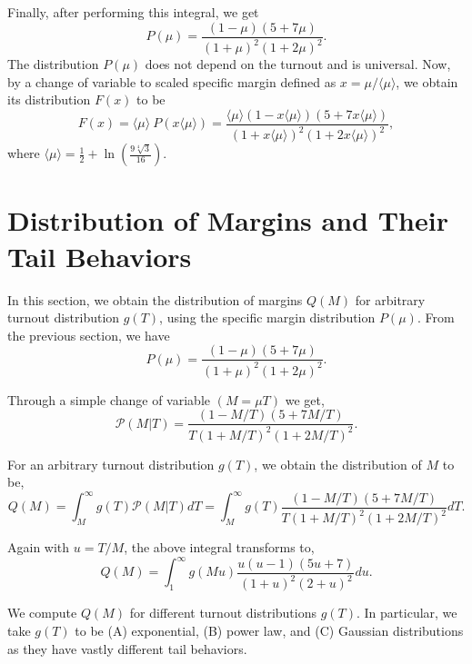 \documentclass[reprint,aps,prl,showpacs,twocolumn, superscriptaddress]{revtex4-2}
\begin{document}
Finally, after performing this integral, we get 
\begin{equation}
    P(\mu) = \frac{(1 - \mu)(5 + 7\mu)}{(1 + \mu)^2(1 + 2\mu)^2}.
\end{equation}
The distribution $P(\mu)$ does not depend on the turnout and is universal. Now, by a change of variable to scaled specific margin defined as $x = \mu / \langle \mu \rangle$, we obtain its distribution $F(x)$ to be
\begin{equation}
    F\left(x\right) = \langle \mu \rangle ~ P\left( x \langle \mu \rangle \right) =  \frac{\langle \mu \rangle(1 - x \langle \mu \rangle)(5 + 7x \langle \mu \rangle)}{(1 + x \langle \mu \rangle)^2(1 + 2x \langle \mu \rangle)^2}, 
\end{equation}
where $\langle \mu\rangle = \frac{1}{2}+\ln \left(\frac{9 \sqrt[4]{3}}{16}\right)$.

\section{Distribution of Margins and Their Tail Behaviors}
In this section, we obtain the distribution of margins $Q(M)$ for arbitrary turnout distribution $g(T)$, using the specific margin distribution $P(\mu)$. From the previous section, we have
\begin{equation}
    P(\mu) = \frac{(1 - \mu)(5 + 7\mu)}{(1 + \mu)^2(1 + 2\mu)^2}.
\end{equation}

Through a simple change of variable $(M = \mu T)$ we get,
\begin{equation}
    \mathcal{P}(M|T) = \frac{(1 - M / T)(5 + 7M /T)}{T(1 + M / T)^2(1 + 2M / T)^2}.
\end{equation}

For an arbitrary turnout distribution $g(T)$, we obtain the distribution of $M$ to be,
\begin{equation}
    Q(M) = \int_{M}^{\infty}g(T)\mathcal{P}(M |T) dT = \int_{M}^{\infty}g(T)\frac{(1 - M / T)(5 + 7M /T)}{T(1 + M / T)^2(1 + 2M / T)^2} dT.
\end{equation}

Again with $u = T / M$, the above integral transforms to,
\begin{equation}
    Q(M) = \int_{1}^{\infty}g(Mu)\frac{u(u - 1)(5u + 7)}{(1 + u)^2 (2 + u)^2}du.
    \label{eq:pm}
\end{equation}

We compute $Q(M)$ for different turnout distributions $g(T)$. In particular, we take $g(T)$ to be (A) exponential, (B) power law, and (C) Gaussian distributions as they have vastly different tail behaviors. 
\end{document}
